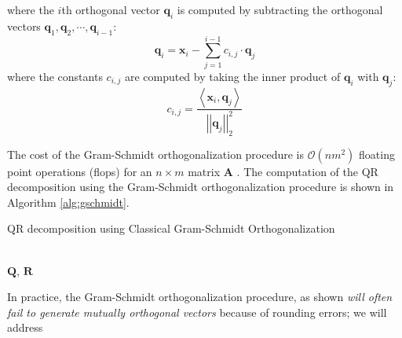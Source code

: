 \documentclass{article}[11pt]
\newcommand{\norm}[1]{\left|\left|#1\right|\right|}
\begin{document}
\begin{mdframed}
\begin{itemize}[leftmargin=16pt]
{   where the $i$th orthogonal vector $\mathbf{q}_{i}$ is computed by subtracting the orthogonal vectors $\mathbf{q}_{1},\mathbf{q}_{2},\cdots,\mathbf{q}_{i-1}$:
   \begin{equation*}
      \mathbf{q}_{i} = \mathbf{x}_{i} - \sum_{j=1}^{i-1}c_{i,j}\cdot\mathbf{q}_{j}
   \end{equation*}
   where the constants $c_{i,j}$ are computed by taking the inner product of $\mathbf{q}_{i}$ with $\mathbf{q}_{j}$:
   \begin{equation*}
      c_{i,j} = \frac{\left<\mathbf{x}_{i},\mathbf{q}_{j}\right>}{\norm{\mathbf{q}_{j}}_{2}^{2}}
   \end{equation*}}
\end{itemize}
\end{mdframed}
The cost of the Gram-Schmidt orthogonalization procedure is $\mathcal{O}(nm^{2})$ floating point operations (flops) for an $n\times{m}$ matrix $\mathbf{A}$ \cite{golub13}.
The computation of the QR decomposition using the Gram-Schmidt orthogonalization procedure is shown in Algorithm \ref{alg:gschmidt}.
\begin{algorithm}[H]
   \begin{algorithmic}[1]
   \caption{QR decomposition using Classical Gram-Schmidt Orthogonalization}\label{alg:gschmidt}
      \EndFor
      \State{$\mathbf{Q}_{j}\gets\mathbf{v}_{j}/\norm{\mathbf{v}_{j}}_{2}$}
   \EndFor
   \\
   \Return $\mathbf{Q}$, $\mathbf{R}$
   \end{algorithmic}
\end{algorithm}
In practice, the Gram-Schmidt orthogonalization procedure, as shown \emph{will often fail to generate mutually orthogonal vectors} because of rounding errors; we will address
\end{document}
